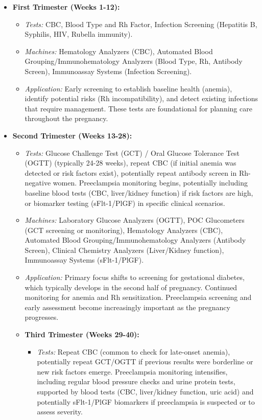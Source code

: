 \documentclass{article}
\begin{document}
\begin{itemize}
    \item \textbf{First Trimester (Weeks 1-12):}
    \begin{itemize}
        \item \textit{Tests:} CBC, Blood Type and Rh Factor, Infection Screening (Hepatitis B, Syphilis, HIV, Rubella immunity).
        \item \textit{Machines:} Hematology Analyzers (CBC), Automated Blood Grouping/Immunohematology Analyzers (Blood Type, Rh, Antibody Screen), Immunoassay Systems (Infection Screening).
        \item \textit{Application:} Early screening to establish baseline health (anemia), identify potential risks (Rh incompatibility), and detect existing infections that require management. These tests are foundational for planning care throughout the pregnancy.
    \end{itemize}
    \item \textbf{Second Trimester (Weeks 13-28):}
    \begin{itemize}
        \item \textit{Tests:} Glucose Challenge Test (GCT) / Oral Glucose Tolerance Test (OGTT) (typically 24-28 weeks), repeat CBC (if initial anemia was detected or risk factors exist), potentially repeat antibody screen in Rh-negative women. Preeclampsia monitoring begins, potentially including baseline blood tests (CBC, liver/kidney function) if risk factors are high, or biomarker testing (sFlt-1/PlGF) in specific clinical scenarios.
        \item \textit{Machines:} Laboratory Glucose Analyzers (OGTT), POC Glucometers (GCT screening or monitoring), Hematology Analyzers (CBC), Automated Blood Grouping/Immunohematology Analyzers (Antibody Screen), Clinical Chemistry Analyzers (Liver/Kidney function), Immunoassay Systems (sFlt-1/PlGF).
        \item \textit{Application:} Primary focus shifts to screening for gestational diabetes, which typically develops in the second half of pregnancy. Continued monitoring for anemia and Rh sensitization. Preeclampsia screening and early assessment become increasingly important as the pregnancy progresses.
    \item \textbf{Third Trimester (Weeks 29-40):}
    \begin{itemize}
        \item \textit{Tests:} Repeat CBC (common to check for late-onset anemia), potentially repeat GCT/OGTT if previous results were borderline or new risk factors emerge. Preeclampsia monitoring intensifies, including regular blood pressure checks and urine protein tests, supported by blood tests (CBC, liver/kidney function, uric acid) and potentially sFlt-1/PlGF biomarkers if preeclampsia is suspected or to assess severity.

\end{itemize}
\end{itemize}
\end{itemize}
\end{document}
